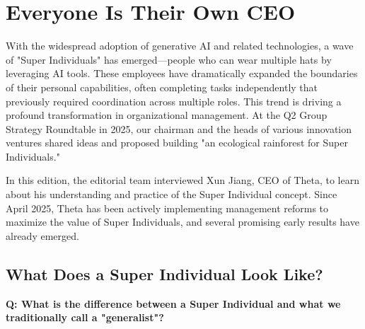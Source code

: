 \newpage

\chapter*{Everyone Is Their Own CEO}

{}
\label{ch:llm_ceo}

\newcommand{\interviewQ}[1]{%
    \vspace{0.8em}
    \noindent\textbf{Q: #1}
    \par
}

\newcommand{\interviewA}[1]{%
    \vspace{0.4em}
    \noindent\textbf{Xun Jiang: }#1
    \par
}

\begin{thinkbox}
With the widespread adoption of generative AI and related technologies, a wave of "Super Individuals" has emerged---people who can wear multiple hats by leveraging AI tools. These employees have dramatically expanded the boundaries of their personal capabilities, often completing tasks independently that previously required coordination across multiple roles. This trend is driving a profound transformation in organizational management. At the Q2 Group Strategy Roundtable in 2025, our chairman and the heads of various innovation ventures shared ideas and proposed building "an ecological rainforest for Super Individuals."

In this edition, the editorial team interviewed Xun Jiang, CEO of Theta, to learn about his understanding and practice of the Super Individual concept. Since April 2025, Theta has been actively implementing management reforms to maximize the value of Super Individuals, and several promising early results have already emerged.
\end{thinkbox}


\section{What Does a Super Individual Look Like?}
\interviewQ{What is the difference between a Super Individual and what we traditionally call a "generalist"?}

